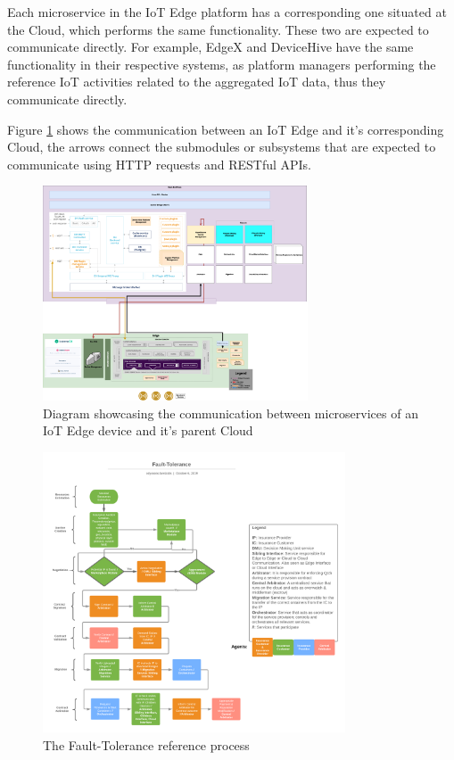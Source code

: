 Each microservice in the IoT Edge platform has a corresponding one situated at the Cloud, which performs the same functionality. These two are expected to communicate directly. For example, EdgeX and DeviceHive have the same functionality in their respective systems, as platform managers performing the reference IoT activities related to the aggregated IoT data, thus they communicate directly.

Figure \ref{fig:cloud2edge} shows the communication between an IoT Edge and it’s corresponding Cloud, the arrows connect the submodules or subsystems that are expected to communicate using HTTP requests and RESTful APIs.
\clearpage
\begin{figure}
    \centering
    \includegraphics[width=0.7\textwidth]{images/CloudEdgeArch_v4.png}
    \caption{Diagram showcasing the communication between microservices of an IoT Edge device and it's parent Cloud}
    \label{fig:cloud2edge}
\end{figure}

\begin{figure}
    \centering
    \includegraphics[width=0.8\textwidth]{images/fault_tolerance.png}
    \caption{The Fault-Tolerance reference process}
    \label{fig:fault-tolerance-process}
\end{figure}
\clearpage

